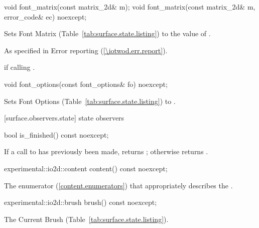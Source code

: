 \begin{itemdecl}
void font_matrix(const matrix_2d& m);
void font_matrix(const matrix_2d& m, error_code& ec) noexcept;
\end{itemdecl}
\begin{itemdescr}
\pnum
\effects
Sets Font Matrix (Table~\ref{tab:surface.state.listing}) to the value of .

\pnum
\throws
As specified in Error reporting (\ref{\iotwod.err.report}).

\pnum
\errors
{} if calling .
\end{itemdescr}

\begin{itemdecl}
void font_options(const font_options& fo) noexcept;
\end{itemdecl}
\begin{itemdescr}
\pnum
\effects
Sets Font Options (Table~\ref{tab:surface.state.listing}) to .
\end{itemdescr}

 [surface.observers.state] { state observers}

\begin{itemdecl}
bool is_finished() const noexcept;
\end{itemdecl}
\begin{itemdescr}
\pnum
\returns
If a call to  has previously been made, returns ; otherwise returns .
\end{itemdescr}

\begin{itemdecl}
experimental::io2d::content content() const noexcept;
\end{itemdecl}
\begin{itemdescr}
\pnum
\returns
The  enumerator (\ref{content.enumerators}) that appropriately describes the \underlyingsurface.
\end{itemdescr}

\begin{itemdecl}
experimental::io2d::brush brush() const noexcept;
\end{itemdecl}
\begin{itemdescr}
\pnum
\returns
The Current Brush (Table~\ref{tab:surface.state.listing}).
\end{itemdescr}

